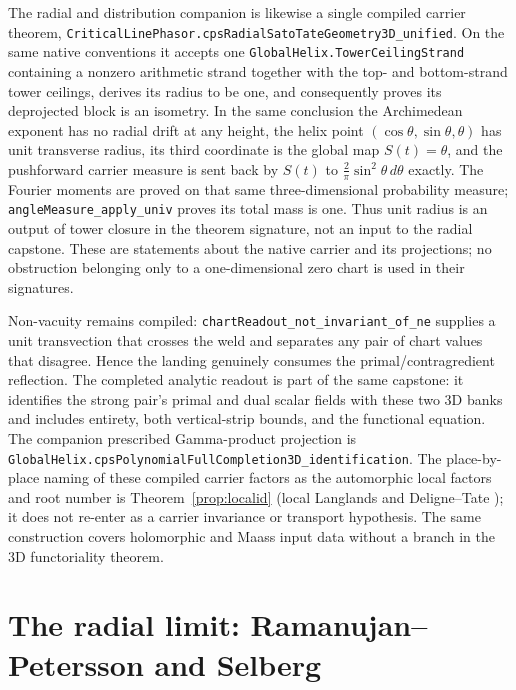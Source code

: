 \documentclass[11pt]{article}
\theoremstyle{definition}
\begin{document}
The radial and distribution companion is likewise a single compiled carrier theorem,
\texttt{CriticalLinePhasor.cpsRadialSatoTateGeometry3D\_unified}. On the same native conventions it
accepts one \texttt{GlobalHelix.TowerCeilingStrand} containing a nonzero arithmetic strand together
with the top- and bottom-strand tower ceilings,
derives its radius to be one, and consequently proves its deprojected block is an isometry.  In
the same conclusion the Archimedean exponent has no radial drift at any height, the helix point
$(\cos\theta,\sin\theta,\theta)$ has unit transverse radius, its third coordinate is the global map
$S(t)=\theta$, and the pushforward carrier measure is sent back by $S(t)$ to
$\frac2\pi\sin^2\theta\,d\theta$ exactly. The Fourier moments are proved on that same
three-dimensional probability measure; \texttt{angleMeasure\_apply\_univ} proves its total mass is
one. Thus unit radius is an output of tower closure in the theorem signature, not an input to the
radial capstone. These are statements about the native carrier and its projections;
no obstruction belonging only to a one-dimensional zero chart is used in their signatures.

Non-vacuity remains compiled: \texttt{chartReadout\_not\_invariant\_of\_ne} supplies a unit
transvection that crosses the weld and separates any pair of chart values that disagree.  Hence the
landing genuinely consumes the primal/contragredient reflection.  The completed analytic readout is
part of the same capstone: it identifies the strong pair's primal and dual scalar fields with these
two 3D banks and includes entirety, both vertical-strip bounds, and the functional equation.  The
companion prescribed Gamma-product projection is
\texttt{GlobalHelix.cpsPolynomialFullCompletion3D\_identification}.  The place-by-place naming of
these compiled carrier factors as the automorphic local factors and root number is
Theorem~\ref{prop:localid}
(local Langlands and Deligne--Tate \cite{Tate}); it does not re-enter as a carrier invariance or
transport hypothesis.  The same construction covers holomorphic and Maass input data without a
branch in the 3D functoriality theorem.
\endgroup

\section{The radial limit: Ramanujan--Petersson and Selberg}\label{sec:radial-limit}
\end{document}
